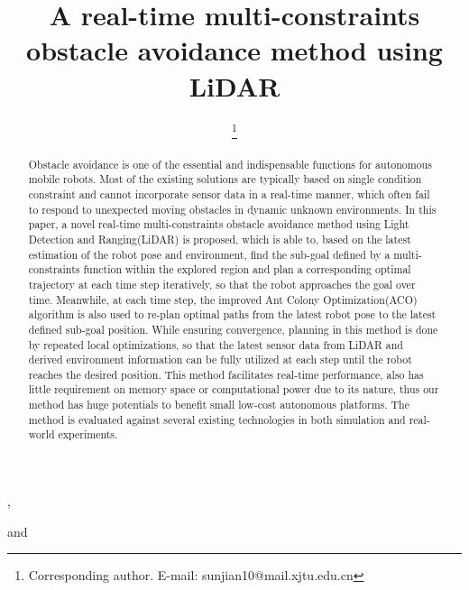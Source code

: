 \documentclass{iosart2c}
\begin{document}
\begin{frontmatter}                           %

%
\title{A real-time multi-constraints obstacle avoidance method using LiDAR} %



\author[A,B]{ },
\author[A,B,C]{ \thanks{Corresponding author. E-mail: sunjian10@mail.xjtu.edu.cn}}
\author[A,B]{ }
and
\author[D]{ }

\address[A]{State Key Laboratory for Strength \& Vibration of Mechanical Structures, School of Aerospace, Xi'an Jiaotong University, Xi'an, PRC, 710049\\
E-mail: cw0523@stu.xjtu.edu.cn}
\address[B]{Shaanxi Engineering Laboratory for Vibration Control of Aerospace Structures, Xi'an Jiaotong University, Xi'an, PRC, 710049}
\address[C]{School of Mechanical Engineering,               Carnegie Mellon University, 5000 Forbes Ave, Pittsburgh, PA 15213, US}
\address[D]{Robotics Institute, School of Computer Science, Carnegie Mellon University, 5000 Forbes Ave, Pittsburgh, PA 15213, US \\
E-mail: sunjian10@mail.xjtu.edu.cn; shuozi2@stu.xjtu.edu.cn; dapengz@andrew.cmu.edu}

\begin{abstract}
Obstacle avoidance is one of the essential and indispensable functions for autonomous mobile robots. Most of the existing solutions are typically based on single condition constraint and cannot incorporate sensor data in a real-time manner, which often fail to respond to unexpected moving obstacles in dynamic unknown environments. In this paper, a novel real-time multi-constraints obstacle avoidance method using Light Detection and Ranging(LiDAR) is proposed, which is able to, based on the latest estimation of the robot pose and environment, find the sub-goal defined by a multi-constraints function within the explored region and plan a corresponding optimal trajectory at each time step iteratively, so that the robot approaches the goal over time. Meanwhile, at each time step, the improved Ant Colony Optimization(ACO) algorithm is also used to re-plan optimal paths from the latest robot pose to the latest defined sub-goal position. While ensuring convergence, planning in this method is done by repeated local optimizations, so that the latest sensor data from LiDAR and derived environment information can be fully utilized at each step until the robot reaches the desired position. This method facilitates real-time performance, also has little requirement on memory space or computational power due to its nature, thus our method has huge potentials to benefit small low-cost autonomous platforms. The method is evaluated against several existing technologies in both simulation and real-world experiments.
\end{abstract}


\end{frontmatter}
\end{document}
